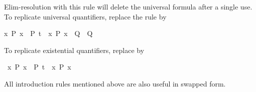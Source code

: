 \begin{isabellebody}
\begin{isamarkuptext}
  Elim-resolution with this rule will delete the universal formula
  after a single use.  To replicate universal quantifiers, replace the
  rule by \begin{isabelle}%
{}{}x{}\ P\ x\ {}\ {}P\ t\ {}\ {}x{}\ P\ x\ {}\ Q{}\ {}\ Q{}%
\end{isabelle}

  To replicate existential quantifiers, replace  by
  \begin{isabelle}%
{}{}{}\ {}{}x{}\ P\ x{}\ {}\ P\ t{}\ {}\ {}x{}\ P\ x{}%
\end{isabelle}

  All introduction rules mentioned above are also useful in swapped
  form.


\end{isamarkuptext}
\end{isabellebody}
